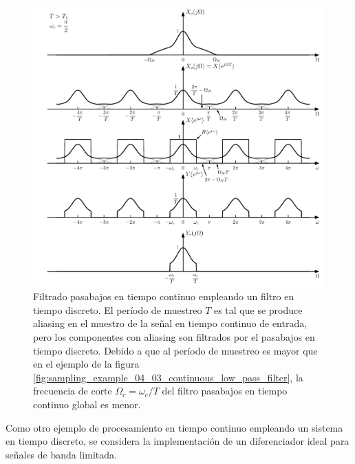 \documentclass[a4paper]{report}
\begin{document}
\begin{figure}[!htb]
 \begin{center}
 \includegraphics[width=1\textwidth]{figuras/sampling_example_04_03_continuous_low_pass_filter_aliasing.pdf}
 \caption{\label{fig:sampling_example_04_03_continuous_low_pass_filter_aliasing} Filtrado pasabajos en tiempo continuo empleando un filtro  en tiempo discreto. El período de muestreo \(T\) es tal que se produce aliasing en el muestro de la señal en tiempo continuo de entrada, pero los componentes con aliasing son filtrados por el pasabajos en tiempo discreto. Debido a que al período de muestreo es mayor que en el ejemplo de la figura \ref{fig:sampling_example_04_03_continuous_low_pass_filter}, la frecuencia de corte \(\Omega_c=\omega_c/T\) del filtro pasabajos en tiempo continuo global es menor.}
 \end{center}
\end{figure}

Como otro ejemplo de procesamiento en tiempo continuo empleando un sistema en tiempo discreto, se considera la implementación de un diferenciador ideal para señales de banda limitada.
\end{document}
